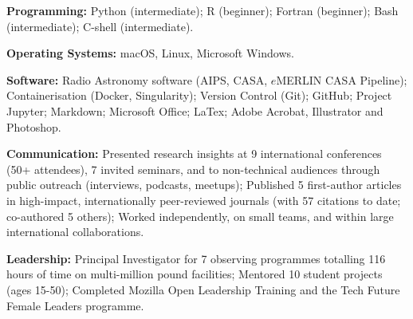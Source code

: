  \vspace{-8pt}
\begin{cvpubs}
  \cvpub
    {
      \begin{cvlist}
      	\item {\textbf{Programming:} Python (intermediate); R (beginner); Fortran (beginner); Bash (intermediate); C-shell (intermediate).}
        \item{\textbf{Operating Systems:} macOS, Linux, Microsoft Windows.}
        \item {\textbf{Software:} Radio Astronomy software (AIPS, CASA, $e$MERLIN CASA Pipeline); Containerisation (Docker, Singularity); Version Control (Git); GitHub; Project Jupyter; Markdown; Microsoft Office; LaTex; Adobe Acrobat, Illustrator and Photoshop.}
        \item {\textbf{Communication:} Presented research insights at 9 international conferences (50+ attendees), 7 invited seminars, and to non-technical audiences through public outreach (interviews, podcasts, meetups); Published 5 first-author articles in high-impact, internationally peer-reviewed journals (with 57 citations to date; co-authored 5 others); Worked independently, on small teams, and within large international collaborations.}
        \item {\textbf{Leadership:} Principal Investigator for 7 observing programmes totalling 116 hours of time on multi-million pound facilities; Mentored 10 student projects (ages 15-50); Completed Mozilla Open Leadership Training and the Tech Future Female Leaders programme.}
      \end{cvlist}
    }
\end{cvpubs}